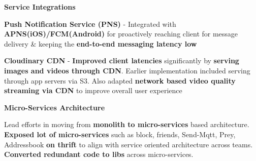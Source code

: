 \begin{cventries}
{\begin{cvitems}
\begin{cventries}
{\begin{cvsubitems}
              \end{cvsubitems}
            }
        \end{cventries}
		\item {\textbf{Service Integrations}}
        \begin{cventries}
          \cventry
            {} %
            {} %
            {} %
            {} %
            {
             \vspace{-20pt}
              \begin{cvsubitems}
                \item {\textbf{Push Notification Service (PNS)} - Integrated with \textbf{APNS(iOS)/FCM(Android)} for proactively reaching client for message delivery \& keeping the \textbf{end-to-end messaging latency low}}
        		\item {\textbf{Cloudinary CDN} - \textbf{Improved client latencies} significantly by \textbf{serving images and videos through CDN}. Earlier implementation included serving through app servers via S3. Also adapted \textbf{network based video quality streaming via CDN} to improve overall user experience}
              \end{cvsubitems}
            }
        \end{cventries}
		\item {\textbf{Micro-Services Architecture}}
        \begin{cventries}
          \cventry
            {} %
            {} %
            {} %
            {} %
            {
             \vspace{-20pt}
              \begin{cvsubitems}
		        \item {Lead efforts in moving from \textbf{monolith to micro-services} based architecture. \textbf{Exposed lot of micro-services} such as block, friends, Send-Mqtt, Prey, Addressbook \textbf{on thrift} to align with service oriented architecture across teams. \textbf{Converted redundant code to libs} across micro-services.}
              \end{cvsubitems}
            }
        \end{cventries}
      \end{cvitems}
      \vspace{6pt}
    }
%    

\end{cventries}
